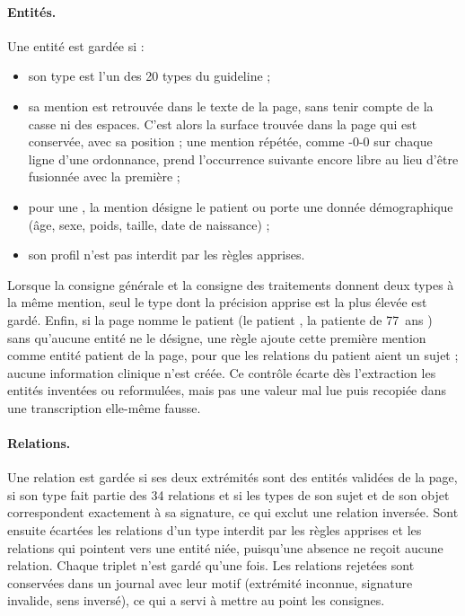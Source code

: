 \paragraph{Entités.} Une entité est gardée si :
\begin{itemize}
  \item son type est l'un des 20 types du guideline ;
  \item sa mention est retrouvée dans le texte de la page, sans tenir compte de la casse ni des espaces. C'est alors la surface trouvée dans la page qui est conservée, avec sa position ; une mention répétée, comme -0-0 \fg{} sur chaque ligne d'une ordonnance, prend l'occurrence suivante encore libre au lieu d'être fusionnée avec la première ;
  \item pour une , la mention désigne le patient ou porte une donnée démographique (âge, sexe, poids, taille, date de naissance) ;
  \item son profil n'est pas interdit par les règles apprises.
\end{itemize}
Lorsque la consigne générale et la consigne des traitements donnent deux types à la même mention, seul le type dont la précision apprise est la plus élevée est gardé. Enfin, si la page nomme le patient (\og le patient \fg{}, \og la patiente de 77~ans \fg{}) sans qu'aucune entité ne le désigne, une règle ajoute cette première mention comme entité patient de la page, pour que les relations du patient aient un sujet ; aucune information clinique n'est créée. Ce contrôle écarte dès l'extraction les entités inventées ou reformulées, mais pas une valeur mal lue puis recopiée dans une transcription elle-même fausse.

\paragraph{Relations.}\label{sec:c4-relations} Une relation est gardée si ses deux extrémités sont des entités validées de la page, si son type fait partie des 34 relations et si les types de son sujet et de son objet correspondent exactement à sa signature, ce qui exclut une relation inversée. Sont ensuite écartées les relations d'un type interdit par les règles apprises et les relations qui pointent vers une entité niée, puisqu'une absence ne reçoit aucune relation. Chaque triplet n'est gardé qu'une fois. Les relations rejetées sont conservées dans un journal avec leur motif (extrémité inconnue, signature invalide, sens inversé), ce qui a servi à mettre au point les consignes.

